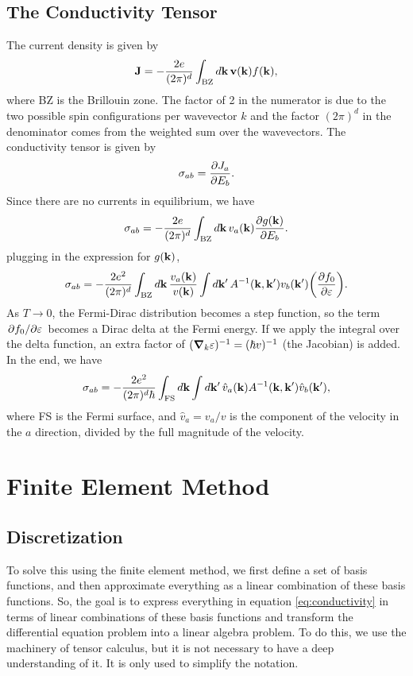 \documentclass[12pt]{article}
\begin{document}
\subsection{The Conductivity Tensor}
The current density is given by
\begin{equation}
    \vb{J} = -\frac{2e}{(2\pi)^d} \int_{\text{BZ}} \dd{\vb{k}} \vb{v}(\vb{k}) f(\vb{k}),
\end{equation}
where BZ is the Brillouin zone. The factor of 2 in the numerator is due to the two possible spin
configurations per wavevector $k$ and the factor $(2\pi)^d$ in the denominator comes from the
weighted sum over the wavevectors. The conductivity tensor is given by
\begin{equation}
    \sigma_{ab} = \pdv{J_a}{E_b}.
\end{equation}
Since there are no currents in equilibrium, we have
\begin{equation}
    \sigma_{ab} = -\frac{2e}{(2\pi)^d} \int_{\text{BZ}}\dd{\vb{k}} v_a(\vb{k}) \pdv{g(\vb{k})}{E_b}.
\end{equation}
plugging in the expression for $g(\vb{k})$,
\begin{equation}
    \sigma_{ab} = -\frac{2e^2}{(2\pi)^d} \int_{\text{BZ}}\dd{\vb{k}} \frac{v_a(\vb{k})}{v(\vb{k})}
    \int\dd{\vb{k'}} A^{-1}(\vb{k}, \vb{k'}) v_b(\vb{k'})\qty(\pdv{f_0}{\varepsilon}).
\end{equation}
As $T\to0$, the Fermi-Dirac distribution becomes a step function, so the term
$\pdv*{f_0}{\varepsilon}$ becomes a Dirac delta at the Fermi energy. If we apply the integral over
the delta function, an extra factor of $(\grad_{k}\varepsilon)^{-1} = (\hbar v)^{-1}$ (the Jacobian)
is added. In the end, we have
\begin{equation}
    \sigma_{ab} = -\frac{2e^2}{(2\pi)^d\hbar} \int_{\text{FS}}\dd{\vb{k}}\int\dd{\vb{k'}}
    \hat{v}_a(\vb{k}) A^{-1}(\vb{k}, \vb{k'}) \hat{v}_b(\vb{k'}),
    \label{eq:conductivity}
\end{equation}
where FS is the Fermi surface, and $\hat{v}_a=v_a/v$ is the component of the velocity in the
$a$ direction, divided by the full magnitude of the velocity.

\section{Finite Element Method} 
\subsection{Discretization}
To solve this using the finite element method, we first define a set of basis functions, and then
approximate everything as a linear combination of these basis functions. So, the goal is to express
everything in equation \eqref{eq:conductivity} in terms of linear combinations of these basis
functions and transform the differential equation problem into a linear algebra problem. To do this,
we use the machinery of tensor calculus, but it is not necessary to have a deep understanding of it.
It is only used to simplify the notation.
\end{document}

